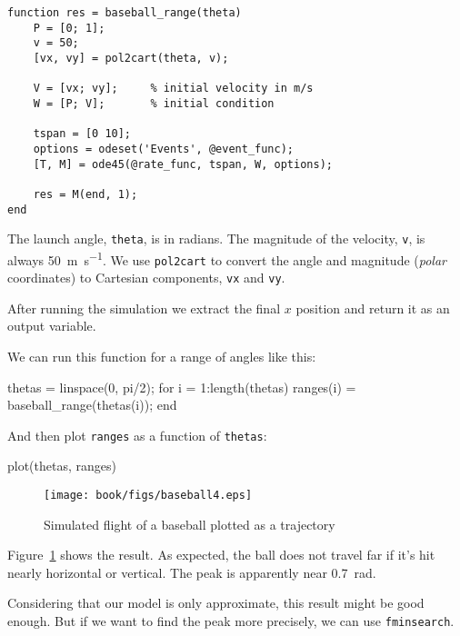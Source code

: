 
\begin{lstlisting}[caption={A function that takes the launch angle of a baseball and returns the distance it travels}, label={lst:baseball_range}]
function res = baseball_range(theta)
    P = [0; 1];       
    v = 50;           
    [vx, vy] = pol2cart(theta, v);
    
    V = [vx; vy];     % initial velocity in m/s
    W = [P; V];       % initial condition
    
    tspan = [0 10];
    options = odeset('Events', @event_func);
    [T, M] = ode45(@rate_func, tspan, W, options);
    
    res = M(end, 1);
end
\end{lstlisting}

The launch angle, \lstinline{theta}, is in radians.  The magnitude of the velocity, \lstinline{v}, is always \SI{50}{\meter\per\second}.  We use \lstinline{pol2cart} to convert the angle and magnitude ({\em polar} coordinates) to Cartesian components, \lstinline{vx} and \lstinline{vy}.


After running the simulation we extract the final $x$ position and return it as an output variable.  

We can run this function for a range of angles like this:

\begin{code}
    thetas = linspace(0, pi/2);
    for i = 1:length(thetas)
        ranges(i) = baseball_range(thetas(i));
    end
\end{code}
And then plot \lstinline{ranges} as a function of \lstinline{thetas}:

\begin{code}
    plot(thetas, ranges)
\end{code}

\begin{figure}
\centerline{\texttt{[image: book/figs/baseball4.eps]}}
\caption{Simulated flight of a baseball plotted as a trajectory}
\label{fig:baseball4}
\end{figure}

Figure~\ref{fig:baseball4} shows the result.  As expected, the ball does not travel far if it's hit nearly horizontal or vertical. 
The peak is apparently near \SI{0.7}{\radian}.

Considering that our model is only approximate, this result might be good enough.  But if we want to find the peak more precisely, we can use \lstinline{fminsearch}.


